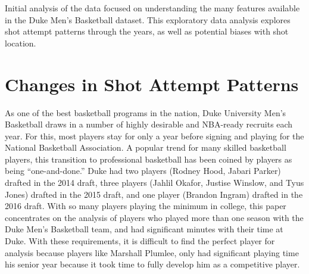 \documentclass[12pt,twoside]{dukestatscithesis}
\theoremstyle{definition}
\theoremstyle{definition}
\theoremstyle{definition}
\theoremstyle{remark}
\begin{document}
Initial analysis of the data focused on understanding the many features
available in the Duke Men's Basketball dataset. This exploratory data
analysis explores shot attempt patterns through the years, as well as
potential biases with shot location.

\section{Changes in Shot Attempt
Patterns}\label{changes-in-shot-attempt-patterns}

As one of the best basketball programs in the nation, Duke University
Men's Basketball draws in a number of highly desirable and NBA-ready
recruits each year. For this, most players stay for only a year before
signing and playing for the National Basketball Association. A popular
trend for many skilled basketball players, this transition to
professional basketball has been coined by players as being
``one-and-done.'' Duke had two players (Rodney Hood, Jabari Parker)
drafted in the 2014 draft, three players (Jahlil Okafor, Justise
Winslow, and Tyus Jones) drafted in the 2015 draft, and one player
(Brandon Ingram) drafted in the 2016 draft. With so many players playing
the minimum in college, this paper concentrates on the analysis of
players who played more than one season with the Duke Men's Basketball
team, and had significant minutes with their time at Duke. With these
requirements, it is difficult to find the perfect player for analysis
because players like Marshall Plumlee, only had significant playing time
his senior year because it took time to fully develop him as a
competitive player.
\end{document}
